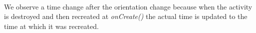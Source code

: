 \documentclass[11pt,english,numbers=endperiod,parskip=half]{scrartcl}
\begin{document}
\setlength\fboxsep{0pt}
\setlength\fboxrule{0.5pt}
\\
\bigskip
{}\\
\bigskip
{}\\
\bigskip
\raggedright
We observe a time change after the orientation change because when the activity is destroyed and then recreated at \textit{onCreate()} the actual time is updated to the time at which it was recreated.
\end{document}

